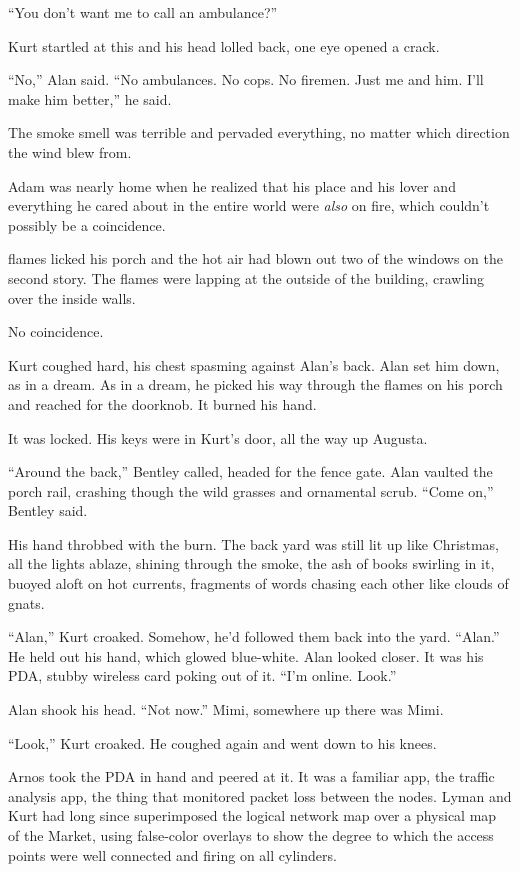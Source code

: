 ``You don't want me to call an ambulance?''

Kurt startled at this and his head lolled back, one eye opened a
crack.

``No,'' Alan said.  ``No ambulances.  No cops.  No firemen.  Just me
and him.  I'll make him better,'' he said.

The smoke smell was terrible and pervaded everything, no matter which
direction the wind blew from. 

Adam was nearly home when he realized that his place and his lover and
everything he cared about in the entire world were \textit{also} on
fire, which couldn't possibly be a coincidence.

 flames licked his porch and the hot air had blown out two of the
windows on the second story.  The flames were lapping at the outside
of the building, crawling over the inside walls. 

No coincidence. 

Kurt coughed hard, his chest spasming against Alan's back.  Alan set
him down, as in a dream.  As in a dream, he picked his way through the
flames on his porch and reached for the doorknob.  It burned his hand. 

It was locked.  His keys were in Kurt's door, all the way up Augusta.

``Around the back,'' Bentley called, headed for the fence gate.  Alan
vaulted the porch rail, crashing though the wild grasses and
ornamental scrub.  ``Come on,'' Bentley said.

His hand throbbed with the burn.  The back yard was still lit up like
Christmas, all the lights ablaze, shining through the smoke, the ash
of books swirling in it, buoyed aloft on hot currents, fragments of
words chasing each other like clouds of gnats.

``Alan,'' Kurt croaked.  Somehow, he'd followed them back into the
yard.  ``Alan.'' He held out his hand, which glowed blue-white.  Alan
looked closer.  It was his PDA, stubby wireless card poking out of it. 
``I'm online.  Look.''

Alan shook his head.  ``Not now.'' Mimi, somewhere up there was Mimi. 

``Look,'' Kurt croaked.  He coughed again and went down to his knees. 

Arnos took the PDA in hand and peered at it.  It was a familiar app,
the traffic analysis app, the thing that monitored packet loss between
the nodes.  Lyman and Kurt had long since superimposed the logical
network map over a physical map of the Market, using false-color
overlays to show the degree to which the access points were well
connected and firing on all cylinders. 


